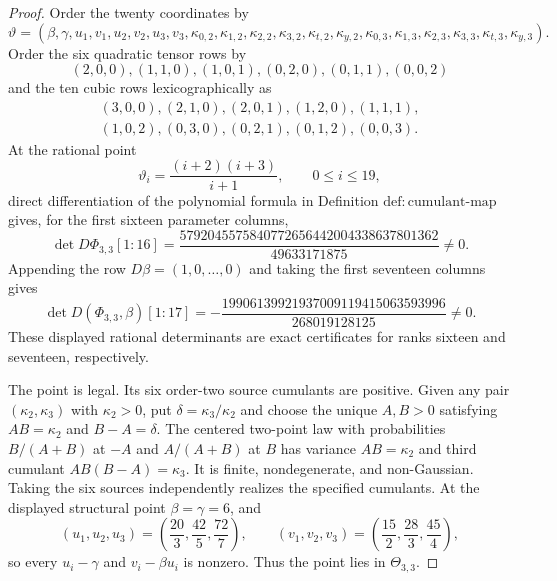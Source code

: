 \documentclass{article}
\begin{document}
\begin{proof}
Order the twenty coordinates by
\[
 \vartheta=(\beta,\gamma,u_1,v_1,u_2,v_2,u_3,v_3,
 \kappa_{0,2},\kappa_{1,2},\kappa_{2,2},\kappa_{3,2},\kappa_{t,2},\kappa_{y,2},
 \kappa_{0,3},\kappa_{1,3},\kappa_{2,3},\kappa_{3,3},\kappa_{t,3},\kappa_{y,3}).
\]
Order the six quadratic tensor rows by
\[
 (2,0,0),(1,1,0),(1,0,1),(0,2,0),(0,1,1),(0,0,2)
\]
and the ten cubic rows lexicographically as
\[
\begin{gathered}
 (3,0,0),(2,1,0),(2,0,1),(1,2,0),(1,1,1),\\
 (1,0,2),(0,3,0),(0,2,1),(0,1,2),(0,0,3).
\end{gathered}
\]
At the rational point
\[
 \vartheta_i=\frac{(i+2)(i+3)}{i+1},\qquad 0\le i\le19,
\]
direct differentiation of the polynomial formula in Definition \(\mathrm{def:cumulant\mbox{-}map}\) gives, for the first sixteen parameter columns,
\[
 \det D\Phi_{3,3}[1{:}16]
 =\frac{5792045575840772656442004338637801362}{49633171875}\ne0.
\]
Appending the row \(D\beta=(1,0,\ldots,0)\) and taking the first seventeen columns gives
\[
 \det D(\Phi_{3,3},\beta)[1{:}17]
 =-\frac{19906139921937009119415063593996}{268019128125}\ne0.
\]
These displayed rational determinants are exact certificates for ranks sixteen and seventeen, respectively.

The point is legal.  Its six order-two source cumulants are positive.  Given any pair \((\kappa_2,\kappa_3)\) with \(\kappa_2>0\), put \(\delta=\kappa_3/\kappa_2\) and choose the unique \(A,B>0\) satisfying \(AB=\kappa_2\) and \(B-A=\delta\).  The centered two-point law with probabilities \(B/(A+B)\) at \(-A\) and \(A/(A+B)\) at \(B\) has variance \(AB=\kappa_2\) and third cumulant \(AB(B-A)=\kappa_3\).  It is finite, nondegenerate, and non-Gaussian.  Taking the six sources independently realizes the specified cumulants.  At the displayed structural point \(\beta=\gamma=6\), and
\[
 (u_1,u_2,u_3)=\left(\frac{20}{3},\frac{42}{5},\frac{72}{7}\right),
 \qquad
 (v_1,v_2,v_3)=\left(\frac{15}{2},\frac{28}{3},\frac{45}{4}\right),
\]
so every \(u_i-\gamma\) and \(v_i-\beta u_i\) is nonzero.  Thus the point lies in \(\Theta_{3,3}\).


\end{proof}
\end{document}
